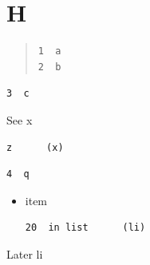 \documentclass[11pt]{article}
\author{root}
\date{\today}
\title{}
\begin{document}
\tableofcontents

\section{H}
\label{sec:org2c6cb4b}
\begin{quote}
\begin{verbatim}
1  a
2  b
\end{verbatim}
\end{quote}

\begin{verbatim}
3  c
\end{verbatim}
See x
\begin{center}
\begin{verbatim}
z      (x)
\end{verbatim}
\end{center}

\begin{note}
\begin{verbatim}
4  q
\end{verbatim}
\end{note}

\begin{itemize}
\item item
\begin{verbatim}
20  in list      (li)
\end{verbatim}
\end{itemize}
Later li
\end{document}
